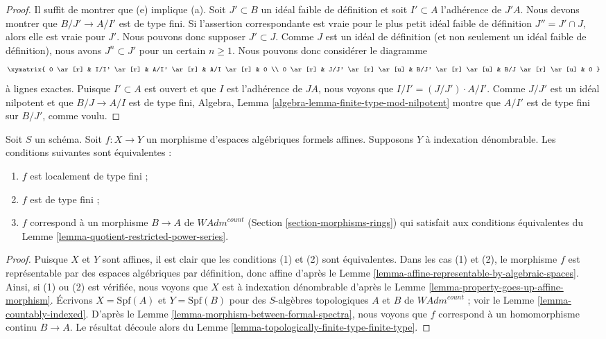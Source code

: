 \begin{proof}
Il suffit de montrer que (e) implique (a). Soit $J' \subset B$ un idéal faible
de définition et soit $I' \subset A$ l'adhérence de $J'A$. Nous devons
montrer que $B/J' \to A/I'$ est de type fini. Si l'assertion correspondante
est vraie pour le plus petit idéal faible de définition $J'' = J' \cap J$, alors elle
est vraie pour $J'$. Nous pouvons donc supposer $J' \subset J$. Comme $J$ est un idéal
de définition (et non seulement un idéal faible de définition), nous avons
$J^n \subset J'$ pour un certain $n \geq 1$. Nous pouvons donc considérer le
diagramme
$$
\xymatrix{
0 \ar[r] & I/I' \ar[r] & A/I' \ar[r] & A/I \ar[r] & 0 \\
0 \ar[r] & J/J' \ar[r] \ar[u] & B/J' \ar[r] \ar[u] & B/J \ar[r] \ar[u] & 0
}
$$
à lignes exactes. Puisque $I' \subset A$ est ouvert et que
$I$ est l'adhérence de $J A$, nous voyons que $I/I' = (J/J') \cdot A/I'$.
Comme $J/J'$ est un idéal nilpotent et que $B/J \to A/I$ est de type fini,
Algebra, Lemma \ref{algebra-lemma-finite-type-mod-nilpotent} montre
que $A/I'$ est de type fini sur $B/J'$, comme voulu.
\end{proof}

\begin{lemma}
\label{lemma-representable-affine-finite-type}
Soit $S$ un schéma. Soit $f : X \to Y$ un morphisme d'espaces algébriques
formels affines. Supposons $Y$ à indexation dénombrable.
Les conditions suivantes sont équivalentes :
\begin{enumerate}
\item $f$ est localement de type fini ;
\item $f$ est de type fini ;
\item $f$ correspond à un morphisme $B \to A$ de $\textit{WAdm}^{count}$
(Section \ref{section-morphisms-rings})
qui satisfait aux conditions équivalentes du
Lemme \ref{lemma-quotient-restricted-power-series}.
\end{enumerate}
\end{lemma}

\begin{proof}
Puisque $X$ et $Y$ sont affines, il est clair que les conditions (1)
et (2) sont équivalentes. Dans les cas (1) et (2), le morphisme $f$
est représentable par des espaces algébriques par définition, donc
affine d'après le Lemme \ref{lemma-affine-representable-by-algebraic-spaces}.
Ainsi, si (1) ou (2) est vérifiée, nous voyons que
$X$ est à indexation dénombrable d'après le
Lemme \ref{lemma-property-goes-up-affine-morphism}.
Écrivons $X = \text{Spf}(A)$ et $Y = \text{Spf}(B)$
pour des $S$-algèbres topologiques $A$ et $B$ de $\textit{WAdm}^{count}$ ; voir le
Lemme \ref{lemma-countably-indexed}. D'après le
Lemme \ref{lemma-morphism-between-formal-spectra},
nous voyons que $f$ correspond à un homomorphisme continu $B \to A$.
Le résultat découle alors du
Lemme \ref{lemma-topologically-finite-type-finite-type}.
\end{proof}

